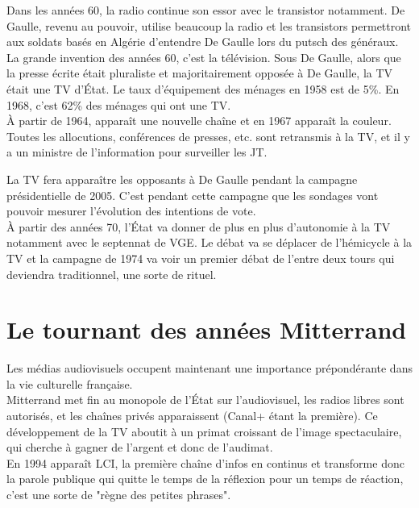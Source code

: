 \documentclass[12pt, a4paper, openany]{book}
\begin{document}
Dans les années 60, la radio continue son essor avec le transistor notamment. De Gaulle, revenu au pouvoir, utilise beaucoup la radio et les transistors permettront aux soldats basés en Algérie d'entendre De Gaulle lors du putsch des généraux. \\
La grande invention des années 60, c'est la télévision. Sous De Gaulle, alors que la presse écrite était pluraliste et majoritairement opposée à De Gaulle, la TV était une TV d'État. Le taux d'équipement des ménages en 1958 est de 5\%. En 1968, c'est 62\% des ménages qui ont une TV. \\
À partir de 1964, apparaît une nouvelle chaîne et en 1967 apparaît la couleur. \\
Toutes les allocutions, conférences de presses, etc. sont retransmis à la TV, et il y a un ministre de l'information pour surveiller les JT. 


La TV fera apparaître les opposants à De Gaulle pendant la campagne présidentielle de 2005. C'est pendant cette campagne que les sondages vont pouvoir mesurer l'évolution des intentions de vote. \\
À partir des années 70, l'État va donner de plus en plus d'autonomie à la TV notamment avec le septennat de VGE. Le débat va se déplacer de l'hémicycle à la TV et la campagne de 1974 va voir un premier débat de l'entre deux tours qui deviendra traditionnel, une sorte de rituel.

\section{Le tournant des années Mitterrand}

Les médias audiovisuels occupent maintenant une importance prépondérante dans la vie culturelle française. \\
Mitterrand met fin au monopole de l'État sur l'audiovisuel, les radios libres sont autorisés, et les chaînes privés apparaissent (Canal+ étant la première). Ce développement de la TV aboutit à un primat croissant de l'image spectaculaire, qui cherche à gagner de l'argent et donc de l'audimat. \\
En 1994 apparaît LCI, la première chaîne d'infos en continus et transforme donc la parole publique qui quitte le temps de la réflexion pour un temps de réaction, c'est une sorte de "règne des petites phrases".
\end{document}
